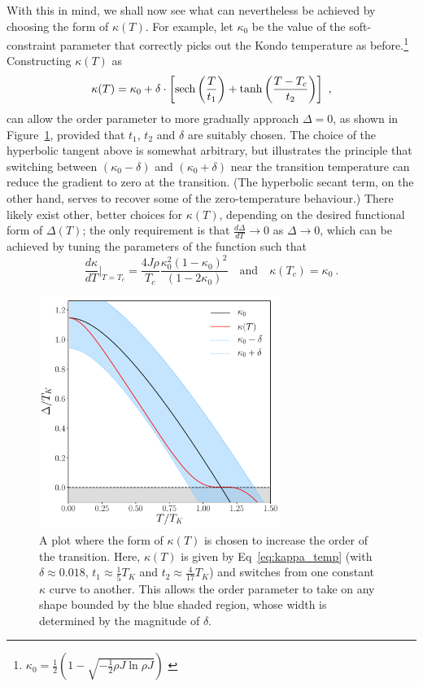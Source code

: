 With this in mind, we shall now see what can nevertheless be achieved by choosing the form of $ \kappa (T) $. For example, let $ \kappa_0 $ be the value of the soft-constraint parameter that correctly picks out the Kondo temperature as before.\footnote{$ \kappa_0 = \frac{1}{2} \left( 1 - \sqrt{- \frac{1}{2} \rho J \ln{\rho J}} \right) $ \cite{Draft}} Constructing $ \kappa(T) $ as
\begin{equation}
\kappa(T) = \kappa_0 + \delta \cdot \left[ \operatorname{sech}{\left( \frac{T}{t_1} \right)} + \tanh{\left( \frac{T - T_c}{t_2} \right)} \right] ~,
\end{equation}
can allow the order parameter to more gradually approach $ \Delta = 0$, as shown in Figure~\ref{fig:delta_smooth}, provided that $ t_1 $, $ t_2 $ and $ \delta $ are suitably chosen. The choice of the hyperbolic tangent above is somewhat arbitrary, but illustrates the principle that switching between $ (\kappa_0 - \delta) $ and $ (\kappa_0 + \delta) $ near the transition temperature can reduce the gradient to zero at the transition. (The hyperbolic secant term, on the other hand, serves to recover some of the zero-temperature behaviour.) There likely exist other, better choices for $ \kappa(T) $, depending on the desired functional form of $ \Delta(T) $; the only requirement is that $ \frac{d \Delta}{d T} \rightarrow 0 $ as $ \Delta \rightarrow 0 $, which can be achieved by tuning the parameters of the function such that 
\begin{equation}
\frac{d \kappa}{d T} \Bigr|_{T = T_c} = \frac{4 J \rho}{T_c} \frac{\kappa^2_0 (1 - \kappa_0)^2}{(1 - 2 \kappa_0)} \quad \text{and} \quad \kappa(T_c) = \kappa_0 ~ .
\end{equation}

\begin{figure}
\centering
\includegraphics[width=0.7\textwidth]{Figures/range_delta_vs_T.pdf}
\caption{A plot where the form of $ \kappa(T) $ is chosen to increase the order of the transition. Here, $ \kappa(T) $ is given by Eq~\eqref{eq:kappa_temp} (with $ \delta \approx 0.018 $, $ t_1 \approx \frac{1}{5} T_K $ and $ t_2 \approx \frac{4}{17} T_K $) and switches from one constant $ \kappa $ curve to another. This allows the order parameter to take on any shape bounded by the blue shaded region, whose width is determined by the magnitude of $ \delta $.}
\label{fig:delta_smooth}
\end{figure}

